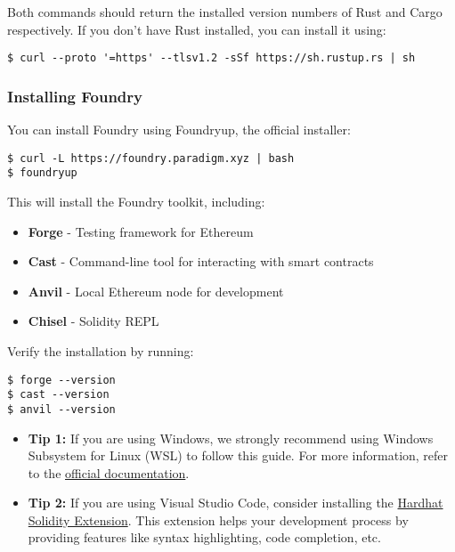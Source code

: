 \documentclass[12pt]{article}
\begin{document}
\noindent
Both commands should return the installed version numbers of Rust and Cargo respectively. If you don't have Rust installed, you can install it using:

\begin{verbatim}
$ curl --proto '=https' --tlsv1.2 -sSf https://sh.rustup.rs | sh
\end{verbatim}

\subsubsection*{Installing Foundry}
You can install Foundry using Foundryup, the official installer:

\begin{verbatim}
$ curl -L https://foundry.paradigm.xyz | bash
$ foundryup
\end{verbatim}

\noindent
This will install the Foundry toolkit, including:
\begin{itemize}
    \item \textbf{Forge} - Testing framework for Ethereum
    \item \textbf{Cast} - Command-line tool for interacting with smart contracts
    \item \textbf{Anvil} - Local Ethereum node for development
    \item \textbf{Chisel} - Solidity REPL
\end{itemize}

Verify the installation by running:

\begin{verbatim}
$ forge --version
$ cast --version
$ anvil --version
\end{verbatim}

\begin{itemize}
    \item \textbf{Tip 1:} If you are using Windows, we strongly recommend using Windows Subsystem for Linux (WSL) to follow this guide. For more information, refer to the \href{https://learn.microsoft.com/en-us/windows/wsl/about}{official documentation}.
    
    \item \textbf{Tip 2:} If you are using Visual Studio Code, consider installing the \href{https://marketplace.visualstudio.com/items?itemName=NomicFoundation.hardhat-solidity}{Hardhat Solidity Extension}. This extension helps your development process by providing features like syntax highlighting, code completion, etc.
\end{itemize}
\end{document}
